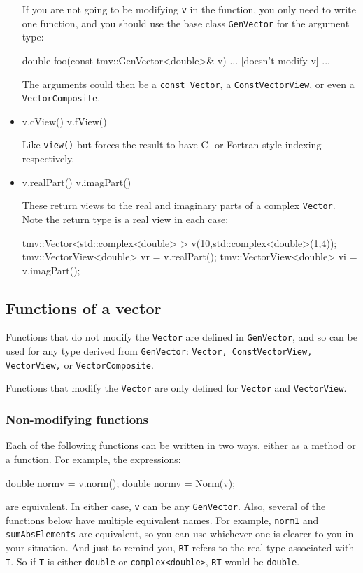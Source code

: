 \documentclass[twoside,letterpaper,11pt]{article}
\renewcommand{\tt}[1]{{\lstinline {#1}}}
\begin{document}
\begin{itemize}
If you are not going to be modifying \tt{v} in the function, you only need to
write one function, and you should use the base class \tt{GenVector} 
for the argument type:
\begin{tmvcode}
double foo(const tmv::GenVector<double>& v)
{ ... [doesn't modify v] ... }
\end{tmvcode}
The arguments could then be a \tt{const Vector}, a \tt{ConstVectorView},
or even a \tt{VectorComposite}.

\item
\begin{tmvcode}
v.cView()
v.fView()
\end{tmvcode}
Like \tt{view()} but forces the result to have C- or Fortran-style indexing respectively.

\item
\begin{tmvcode}
v.realPart()
v.imagPart()
\end{tmvcode}
These return views to the real and imaginary parts of a complex \tt{Vector}.
Note the return type is a real view in each case:
\begin{tmvcode}
tmv::Vector<std::complex<double> > v(10,std::complex<double>(1,4));
tmv::VectorView<double> vr = v.realPart();
tmv::VectorView<double> vi = v.imagPart();
\end{tmvcode}

\end{itemize}

\subsection{Functions of a vector }
\label{Vector_Functions}

Functions that do not modify the \tt{Vector} are defined in 
\tt{GenVector}, and so can be used for any type derived from \tt{GenVector}:
\tt{Vector, ConstVectorView, VectorView,} or \tt{VectorComposite}.

Functions that modify the \tt{Vector} are only defined for 
\tt{Vector} and \tt{VectorView}.

\subsubsection{Non-modifying functions}

Each of the following functions can be written in two ways, either as a method or a function.
For example, the expressions:
\begin{tmvcode}
double normv = v.norm();
double normv = Norm(v);
\end{tmvcode}
are equivalent.  In either case, \tt{v} can be any \tt{GenVector}.
Also, several of the functions below have multiple equivalent names.  For example,
\tt{norm1} and \tt{sumAbsElements} are equivalent, so you can use whichever one is
clearer to you in your situation.
And just to remind you, \tt{RT} refers to the 
real type associated with \tt{T}.  So if \tt{T} is either \tt{double} or \tt{complex<double>},
\tt{RT} would be \tt{double}.
\end{document}
